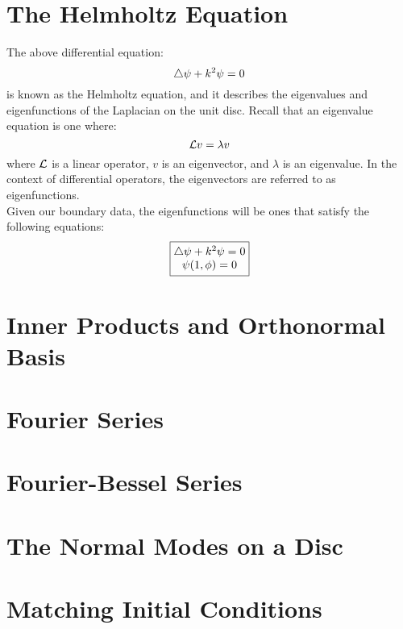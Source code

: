 \documentclass{paper}
\begin{document}
\section{The Helmholtz Equation}
The above differential equation:
\begin{equation}
  \bigtriangleup \psi+k^2\psi=0
\end{equation}
is known as the Helmholtz equation, and it describes the eigenvalues and eigenfunctions of the Laplacian on the unit disc. Recall that an eigenvalue equation is one where:
\begin{equation}
  \mathcal{L}v = \lambda v
\end{equation}
where $\mathcal{L}$ is a linear operator, $v$ is an eigenvector, and $\lambda$ is an eigenvalue. In the context of differential operators, the eigenvectors are referred to as eigenfunctions.\\
Given our boundary data, the eigenfunctions will be ones that satisfy the following equations:
\begin{equation}
  \boxed{
    \begin{matrix}
      \bigtriangleup \psi+k^2\psi=0 \\ 
      \psi(1,\phi) = 0
    \end{matrix}
  }
\end{equation}
\section{Inner Products and Orthonormal Basis}
\section{Fourier Series}
\section{Fourier-Bessel Series}
\section{The Normal Modes on a Disc}
\section{Matching Initial Conditions}
\end{document}
